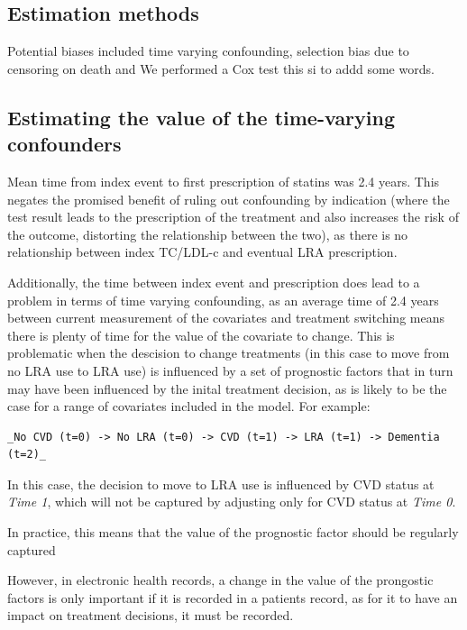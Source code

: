 \documentclass[a4paper, twoside]{templates/ociamthesis}
\begin{document}
\hypertarget{estimation-methods}{%
\subsection{Estimation methods}\label{estimation-methods}}

Potential biases included time varying confounding, selection bias due to censoring on death and
We performed a Cox test this si to addd some words.

\hypertarget{estimating-the-value-of-the-time-varying-confounders}{%
\subsection{Estimating the value of the time-varying confounders}\label{estimating-the-value-of-the-time-varying-confounders}}

Mean time from index event to first prescription of statins was 2.4 years. This negates the promised benefit of ruling out confounding by indication (where the test result leads to the prescription of the treatment and also increases the risk of the outcome, distorting the relationship between the two), as there is no relationship between index TC/LDL-c and eventual LRA prescription.

Additionally, the time between index event and prescription does lead to a problem in terms of time varying confounding, as an average time of 2.4 years between current measurement of the covariates and treatment switching means there is plenty of time for the value of the covariate to change. This is problematic when the descision to change treatments (in this case to move from no LRA use to LRA use) is influenced by a set of prognostic factors that in turn may have been influenced by the inital treatment decision, as is likely to be the case for a range of covariates included in the model. For example:

\begin{verbatim}
_No CVD (t=0) -> No LRA (t=0) -> CVD (t=1) -> LRA (t=1) -> Dementia (t=2)_
\end{verbatim}

In this case, the decision to move to LRA use is influenced by CVD status at \emph{Time 1}, which will not be captured by adjusting only for CVD status at \emph{Time 0}.

In practice, this means that the value of the prognostic factor should be regularly captured

However, in electronic health records, a change in the value of the prongostic factors is only important if it is recorded in a patients record, as for it to have an impact on treatment decisions, it must be recorded.
\end{document}
